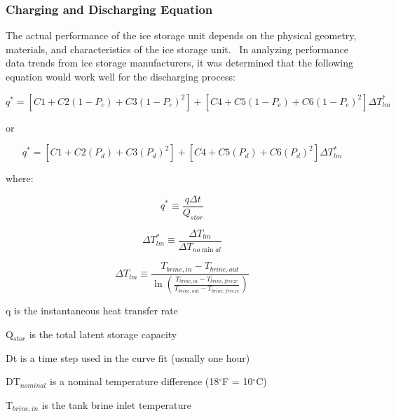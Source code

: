 \subsubsection{Charging and Discharging Equation}\label{charging-and-discharging-equation}

The actual performance of the ice storage unit depends on the physical geometry, materials, and characteristics of the ice storage unit.~ In analyzing performance data trends from ice storage manufacturers, it was determined that the following equation would work well for the discharging process:

\begin{equation}
{q^*} = \left[ {C1 + C2\left( {1 - {P_c}} \right) + C3{{\left( {1 - {P_c}} \right)}^2}} \right] + \left[ {C4 + C5\left( {1 - {P_c}} \right) + C6{{\left( {1 - {P_c}} \right)}^2}} \right]\Delta T_{lm}^*
\end{equation}

or

\begin{equation}
{q^*} = \left[ {C1 + C2\left( {{P_d}} \right) + C3{{\left( {{P_d}} \right)}^2}} \right] + \left[ {C4 + C5\left( {{P_d}} \right) + C6{{\left( {{P_d}} \right)}^2}} \right]\Delta T_{lm}^*
\end{equation}

where:

\begin{equation}
{q^*} \equiv \frac{{q\Delta t}}{{{Q_{stor}}}}
\end{equation}

\begin{equation}
\Delta T_{lm}^* \equiv \frac{{\Delta {T_{lm}}}}{{\Delta {T_{no\min al}}}}
\end{equation}

\begin{equation}
\Delta {T_{lm}} \equiv \frac{{{T_{brine,in}} - {T_{brine,out}}}}{{\ln \left( {\frac{{{T_{brine,in}} - {T_{brine,freeze}}}}{{{T_{brine,out}} - {T_{brine,freeze}}}}} \right)}}
\end{equation}

q is the instantaneous heat transfer rate

Q\(_{stor}\) is the total latent storage capacity

Dt is a time step used in the curve fit (usually one hour)

DT\(_{nominal}\) is a nominal temperature difference (18\(^{\circ}\)F = 10\(^{\circ}\)C)

T\(_{brine,in}\) is the tank brine inlet temperature

